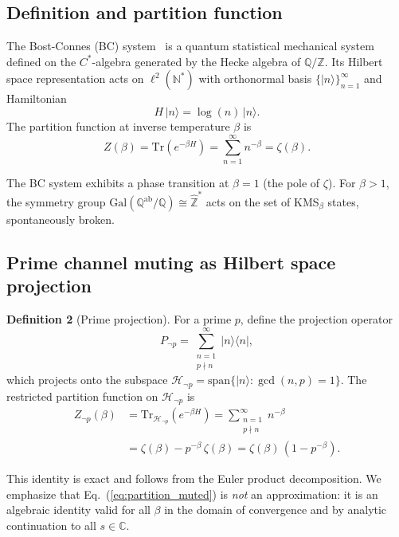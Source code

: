 \documentclass[aps,prd,twocolumn,superscriptaddress,nofootinbib]{revtex4-2}
\newcommand{\Tr}{\mathrm{Tr}}
\newcommand{\Gal}{\mathrm{Gal}}
\newcommand{\Zhat}{\hat{\mathbb{Z}}}
\begin{document}
\subsection{Definition and partition function}

The Bost-Connes (BC) system~\cite{BostConnes1995,ConnesMarcolli2006}
is a quantum statistical mechanical system defined on the
$C^*$-algebra generated by the Hecke algebra of $\mathbb{Q}/\mathbb{Z}$.
Its Hilbert space representation acts on $\ell^2(\mathbb{N}^*)$
with orthonormal basis $\{|n\rangle\}_{n=1}^{\infty}$ and
Hamiltonian
\begin{equation}
  H\,|n\rangle = \log(n)\,|n\rangle.
  \label{eq:bc_ham}
\end{equation}
The partition function at inverse temperature $\beta$ is
\begin{equation}
  Z(\beta) = \Tr(e^{-\beta H}) = \sum_{n=1}^{\infty} n^{-\beta} = \zeta(\beta).
  \label{eq:bc_partition}
\end{equation}

The BC system exhibits a phase transition at $\beta = 1$
(the pole of $\zeta$). For $\beta > 1$, the symmetry group
$\Gal(\mathbb{Q}^{\mathrm{ab}}/\mathbb{Q}) \cong \Zhat^*$
acts on the set of KMS$_\beta$ states, spontaneously broken.

\subsection{Prime channel muting as Hilbert space projection}

\noindent\textbf{Definition 2} (Prime projection).
For a prime $p$, define the projection operator
\begin{equation}
  P_{\neg p} = \sum_{\substack{n=1 \\ p \nmid n}}^{\infty} |n\rangle\langle n|,
  \label{eq:projection}
\end{equation}
which projects onto the subspace
$\mathcal{H}_{\neg p} = \mathrm{span}\{|n\rangle : \gcd(n,p)=1\}$.
The restricted partition function on $\mathcal{H}_{\neg p}$ is
\begin{align}
  Z_{\neg p}(\beta) &= \Tr_{\mathcal{H}_{\neg p}}(e^{-\beta H})
  = \sum_{\substack{n=1 \\ p \nmid n}}^{\infty} n^{-\beta} \nonumber \\
  &= \zeta(\beta) - p^{-\beta}\,\zeta(\beta) = \zeta(\beta)\,(1 - p^{-\beta}).
  \label{eq:partition_muted}
\end{align}

This identity is exact and follows from the Euler product decomposition.
We emphasize that Eq.~(\ref{eq:partition_muted}) is \emph{not}
an approximation: it is an algebraic identity valid for all
$\beta$ in the domain of convergence and by analytic continuation
to all $s \in \mathbb{C}$.
\end{document}
